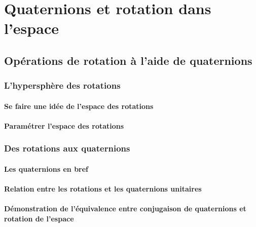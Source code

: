 
\chapter{Quaternions et rotation dans l'espace}


\section{Opérations de rotation à l'aide de quaternions}
	
	\subsection{L'hypersphère des rotations}
		\subsubsection{Se faire une idée de l'espace des rotations}
			
		\subsubsection{Paramétrer l'espace des rotations}
			
	\subsection{Des rotations aux quaternions}
		\subsubsection{Les quaternions en bref}
			
		\subsubsection[Rel. entre rotations et quaternions]{Relation entre les rotations et les quaternions unitaires}
			
		\subsubsection[Dem. equiv. quaternions et rotation de l'espace]{Démonstration de l'équivalence entre conjugaison de quaternions et rotation de l'espace}
			
